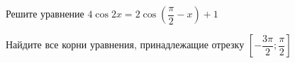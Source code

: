 \begin{ex}
	\begin{condition}
		\begin{enumcols}[label=\asbuk*)]
			\item Решите уравнение \( 4\cos 2x = 2\cos{\left(\dfrac{\pi}{2}-x\right)} + 1 \)
			\item Найдите все корни уравнения, принадлежащие отрезку \( \left[-\dfrac{3\pi}{2};\dfrac{\pi}{2}\right] \)
		\end{enumcols}
	\end{condition}
\end{ex}